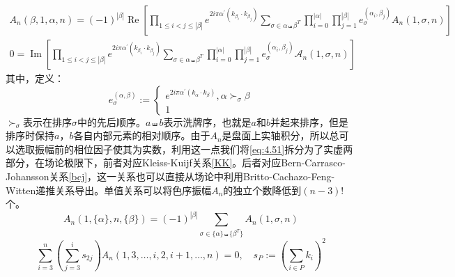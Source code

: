 \begin{equation}
	\label{eq:4.51}
\begin{gathered}
		A_n(\beta,1,\alpha,n)=(-1)^{|\beta|}\operatorname{Re}\left[\prod_{1\leq i<j\leq |\beta|}e^{2i\pi\alpha^{\prime}(k_{\beta_i}\cdot k_{\beta_j})}\sum_{\sigma\in\alpha\shuffle \beta^T}\prod_{i=0}^{|\alpha|}\prod_{j=1}^{|\beta|}e_\sigma^{(\alpha_i,\beta_j)}A_n(1,\sigma,n)\right]\\
	0=\operatorname{Im}\left[\prod_{1\leq i<j\leq |\beta|}e^{2i\pi\alpha^{\prime}(k_{\beta_i}\cdot k_{\beta_j})}\sum_{\sigma\in\alpha\shuffle \beta^T}\prod_{i=0}^{|\alpha|}\prod_{j=1}^{|\beta|}e_\sigma^{(\alpha_i,\beta_j)}\mathcal{A}_n(1,\sigma,n)\right]
\end{gathered}
\end{equation}
其中，定义：
\begin{equation}
	e^{(\alpha,\beta)}_{\sigma}:=\begin{cases} e^{2i\pi\alpha^{\prime}(k_\alpha\cdot k_\beta)},\alpha\succ_\sigma\beta\\1\end{cases}
\end{equation}
$\succ_{\sigma}$表示在排序$\sigma$中的先后顺序。$a\shuffle b$表示洗牌序，也就是$a$和$b$并起来排序，但是排序时保持$a$，$b$各自内部元素的相对顺序。由于$A_n$是盘面上实轴积分，所以总可以选取振幅前的相位因子使其为实数，利用这一点我们将\ref{eq:4.51}拆分为了实虚两部分，在场论极限下，前者对应Kleiss-Kuijf关系\cite{Kleiss:1988ne,DelDuca:1999rs}\ref{KK}。后者对应Bern-Carrasco-Johansson关系\cite{Bern:2008qj}\ref{bcj}，这一关系也可以直接从场论中利用Britto-Cachazo-Feng-Witten递推关系\cite{Britto:2004ap,Britto:2005fq}导出\cite{Chen:2011jxa}。单值关系可以将色序振幅$A_n$的独立个数降低到$(n-3)!$个。
\begin{equation}
	\label{KK}
	A_n(1,\{\alpha\},n,\{\beta\})=(-1)^{|\beta|}\sum_{\sigma\in\{\alpha\}\shuffle\{\beta^T\}}A_n(1,\sigma,n)
\end{equation}
\begin{equation}
	\label{bcj}
	\sum_{i=3}^n\left(\sum_{j=3}^is_{2j}\right)A_n(1,3,\ldots,i,2,i+1,\ldots,n)=0,\quad s_P:=\left(\sum_{i\in P} k_i\right)^2
\end{equation}
